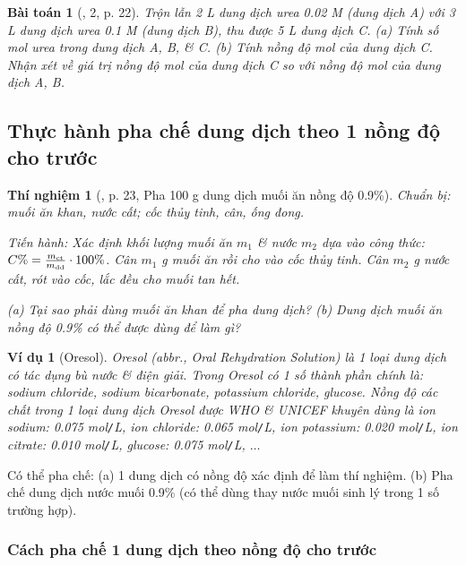 \documentclass{article}
\newtheorem{baitoan}{Bài toán}
\newtheorem{thinghiem}{Thí nghiệm}
\newtheorem{vidu}{Ví dụ}
\begin{document}
\begin{baitoan}[\cite{SGK_KHTN_8_KNTTVCS}, 2, p. 22]
	Trộn lẫn \emph{2 L} dung dịch urea \emph{0.02 M} (dung dịch A) với \emph{3 L} dung dịch urea \emph{0.1 M} (dung dịch B), thu được \emph{5 L} dung dịch C. (a) Tính số mol urea trong dung dịch A, B, \& C. (b) Tính nồng độ mol của dung dịch C. Nhận xét về giá trị nồng độ mol của dung dịch C so với nồng độ mol của dung dịch A, B.
\end{baitoan}

\subsection{Thực hành pha chế dung dịch theo 1 nồng độ cho trước}

\begin{thinghiem}[\cite{SGK_KHTN_8_KNTTVCS}, p. 23, Pha 100 g dung dịch muối ăn nồng độ 0.9\%]
	\emph{Chuẩn bị:} muối ăn khan, nước cất; cốc thủy tinh, cân, ống đong.
	
	\emph{Tiến hành:} Xác định khối lượng muối ăn $m_1$ \& nước $m_2$ dựa vào công thức: $C\% = \frac{m_{\rm ct}}{m_{\rm dd}}\cdot100\%$. Cân $m_1$ g muối ăn rồi cho vào cốc thủy tinh. Cân $m_2$ g nước cất, rót vào cốc, lắc đều cho muối tan hết.
	
	(a) Tại sao phải dùng muối ăn khan để pha dung dịch? (b) Dung dịch muối ăn nồng độ \emph{0.9\%} có thể được dùng để làm gì?
\end{thinghiem}

\begin{vidu}[Oresol]
	\emph{Oresol} (abbr., Oral Rehydration Solution) là 1 loại dung dịch có tác dụng bù nước \& điện giải. Trong Oresol có 1 số thành phần chính là: sodium chloride, sodium bicarbonate, potassium chloride, glucose. Nồng độ các chất trong 1 loại dung dịch Oresol được WHO \& UNICEF khuyên dùng là \emph{ion sodium: 0.075 mol\texttt{/}L, ion chloride: 0.065 mol\texttt{/}L, ion potassium: 0.020 mol\texttt{/}L, ion citrate: 0.010 mol\texttt{/}L, glucose: 0.075 mol\texttt{/}L, $\ldots$}
\end{vidu}
Có thể pha chế: (a) 1 dung dịch có nồng độ xác định để làm thí nghiệm. (b)  Pha chế dung dịch nước muối 0.9\% (có thể dùng thay nước muối sinh lý trong 1 số trường hợp).

\subsubsection{Cách pha chế 1 dung dịch theo nồng độ cho trước}
\end{document}
